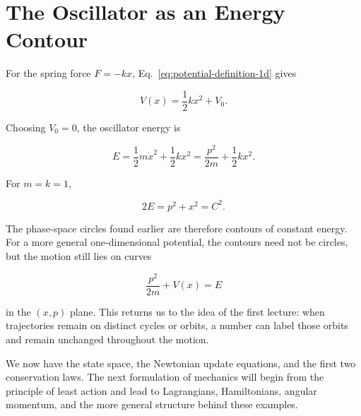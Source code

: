 \section{The Oscillator as an Energy Contour}
\enlargethispage{3\baselineskip}

For the spring force \(F=-kx\), Eq.~\eqref{eq:potential-definition-1d} gives

\begin{equation}
  V(x)=\frac12kx^2+V_0.
  \label{eq:spring-potential}
\end{equation}

Choosing \(V_0=0\), the oscillator energy is

\begin{equation}
  E=\frac12m\dot x^2+\frac12kx^2
   =\frac{p^2}{2m}+\frac12kx^2.
  \label{eq:oscillator-energy}
\end{equation}

For \(m=k=1\),

\begin{equation}
  2E=p^2+x^2=C^2.
  \label{eq:oscillator-energy-circle}
\end{equation}

The phase-space circles found earlier are therefore contours of constant
energy.  For a more general one-dimensional potential, the contours need not
be circles, but the motion still lies on curves

\begin{equation}
  \frac{p^2}{2m}+V(x)=E
  \label{eq:general-energy-contour}
\end{equation}

in the \((x,p)\) plane.  This returns us to the idea of the first lecture: when
trajectories remain on distinct cycles or orbits, a number can label those
orbits and remain unchanged throughout the motion.

We now have the state space, the Newtonian update equations, and the first two
conservation laws.  The next formulation of mechanics will begin from the
principle of least action and lead to Lagrangians, Hamiltonians, angular
momentum, and the more general structure behind these examples.

\begin{classroomqa}
\end{classroomqa}

